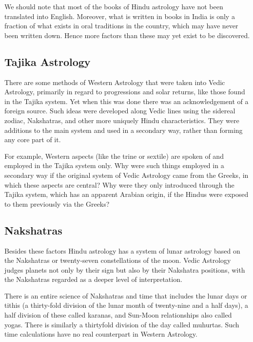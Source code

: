 We should note that most of the books of Hindu astrology have not been translated into English. Moreover, what is written in books in India is only a fraction of what exists in oral traditions in the country, which may have never been written down. Hence more factors than these may yet exist to be discovered.

 

\subsection{Tajika Astrology}

 

There are some methods of Western Astrology that were taken into Vedic Astrology, primarily in regard to progressions and solar returns, like those found in the Tajika system. Yet when this was done there was an acknowledgement of a foreign source. Such ideas were developed along Vedic lines using the sidereal zodiac, Nakshatras, and other more uniquely Hindu characteristics. They were additions to the main system and used in a secondary way, rather than forming any core part of it.

 

For example, Western aspects (like the trine or sextile) are spoken of and employed in the Tajika system only. Why were such things employed in a secondary way if the original system of Vedic Astrology came from the Greeks, in which these aspects are central? Why were they only introduced through the Tajika system, which has an apparent Arabian origin, if the Hindus were exposed to them previously via the Greeks?

 

\subsection{Nakshatras}

 

Besides these factors Hindu astrology has a system of lunar astrology based on the Nakshatras or twenty-seven constellations of the moon. Vedic Astrology judges planets not only by their sign but also by their Nakshatra positions, with the Nakshatras regarded as a deeper level of interpretation.

 

There is an entire science of Nakshatras and time that includes the lunar days or tithis (a thirty-fold division of the lunar month of twenty-nine and a half days), a half division of these called karanas, and Sun-Moon relationships also called yogas. There is similarly a thirtyfold division of the day called muhurtas. Such time calculations have no real counterpart in Western Astrology.

